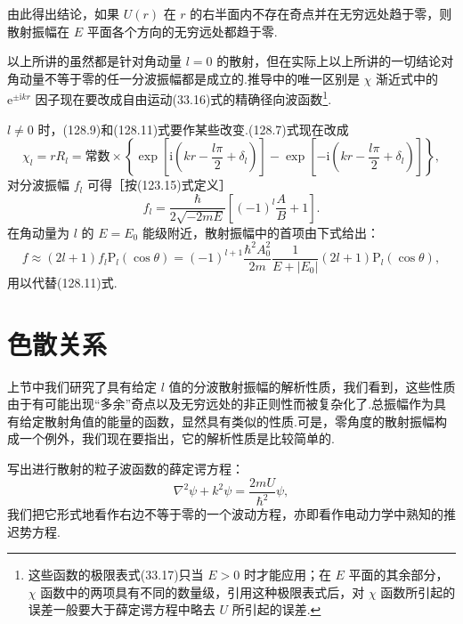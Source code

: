 由此得出结论，如果 $U(r)$ 在 $r$ 的右半面内不存在奇点并在无穷远处趋于零，则散射振幅在 $E$ 平面各个方向的无穷远处都趋于零.

以上所讲的虽然都是针对角动量 $l=0$ 的散射，但在实际上以上所讲的一切结论对角动量不等于零的任一分波振幅都是成立的.推导中的唯一区别是 $\chi$ 渐近式中的 $\mathrm{e}^{\pm\mathrm{i}kr}$ 因子现在要改成自由运动(33.16)式的精确径向波函数\footnote{这些函数的极限表式(33.17)只当 $E>0$ 时才能应用；在 $E$ 平面的其余部分，$\chi$ 函数中的两项具有不同的数量级，引用这种极限表式后，对 $\chi$ 函数所引起的误差一般要大于薛定谔方程中略去 $U$ 所引起的误差.}.

$l\neq0$ 时，(128.9)和(128.11)式要作某些改变.(128.7)式现在改成
\begin{equation}
  \chi_l=rR_l=\text{常数}\times
  \left\{\exp\left[\mathrm{i}\left(kr-\frac{l\pi}{2}+\delta_l\right)\right]
  -\exp\left[-\mathrm{i}\left(kr-\frac{l\pi}{2}+\delta_l\right)\right]\right\},
\end{equation}
对分波振幅 $f_l$ 可得［按(123.15)式定义］
\begin{equation}
  f_l=\frac{\hbar}{2\sqrt{-2mE}}
  \left[(-1)^l\frac{A}{B}+1\right].
\end{equation}
在角动量为 $l$ 的 $E=E_0$ 能级附近，散射振幅中的首项由下式给出：
\begin{equation}
  f\approx(2l+1)f_l\mathrm{P}_l(\cos\theta)
  =(-1)^{l+1}\frac{\hbar^2A_0^2}{2m}
  \frac{1}{E+|E_0|}(2l+1)\mathrm{P}_l(\cos\theta),
\end{equation}
用以代替(128.11)式.

\section{色散关系}

上节中我们研究了具有给定 $l$ 值的分波散射振幅的解析性质，我们看到，这些性质由于有可能出现“多余”奇点以及无穷远处的非正则性而被复杂化了.总振幅作为具有给定散射角值的能量的函数，显然具有类似的性质.可是，零角度的散射振幅构成一个例外，我们现在要指出，它的解析性质是比较简单的.

写出进行散射的粒子波函数的薛定谔方程：
\begin{equation}
  \nabla^2\psi+k^2\psi=\frac{2mU}{\hbar^2}\psi,
\end{equation}
我们把它形式地看作右边不等于零的一个波动方程，亦即看作电动力学中熟知的推迟势方程.

